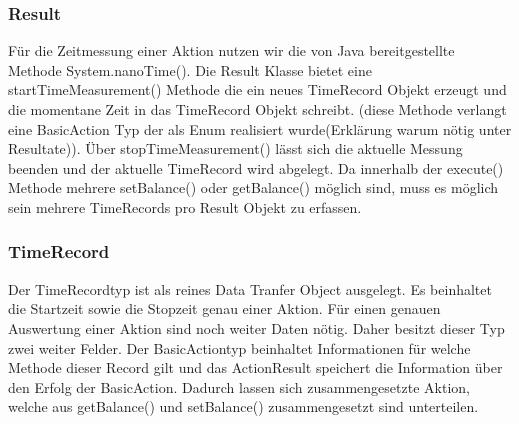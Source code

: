 \subsubsection{Result}
\label{sec:result}
Für die Zeitmessung einer Aktion nutzen wir die von Java bereitgestellte Methode System.nanoTime(). Die Result Klasse bietet eine startTimeMeasurement() Methode die ein neues TimeRecord Objekt erzeugt und die momentane Zeit in das TimeRecord Objekt schreibt. (diese Methode verlangt eine BasicAction Typ der als Enum realisiert wurde(Erklärung warum nötig unter Resultate)). Über stopTimeMeasurement() lässt sich die aktuelle Messung beenden und der aktuelle TimeRecord wird abgelegt. Da innerhalb der execute() Methode mehrere setBalance() oder getBalance() möglich sind, muss es möglich sein mehrere TimeRecords pro Result Objekt zu erfassen.

\subsubsection{TimeRecord}
\label{sec:timeRecord}
Der TimeRecordtyp ist als reines Data Tranfer Object ausgelegt. Es beinhaltet die Startzeit sowie die Stopzeit genau einer Aktion. Für einen genauen Auswertung einer Aktion sind noch weiter Daten nötig. Daher besitzt dieser Typ zwei weiter Felder. Der BasicActiontyp beinhaltet Informationen für welche Methode dieser Record gilt und das ActionResult speichert die Information über den Erfolg der BasicAction. Dadurch lassen sich zusammengesetzte Aktion, welche aus getBalance() und setBalance() zusammengesetzt sind unterteilen. 




